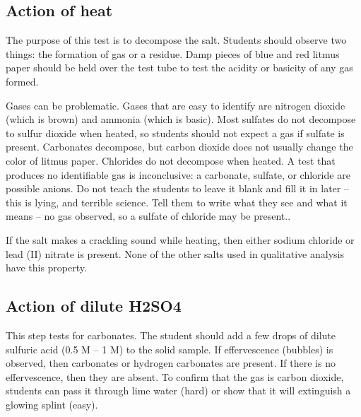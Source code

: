 \subsection{Action of heat}
The purpose of this test is to decompose the salt. 
Students should observe two things: the formation of gas or a residue. 
Damp pieces of blue and red litmus paper should be held 
over the test tube to test the acidity or basicity of any gas formed.

Gases can be problematic. 
Gases that are easy to identify are nitrogen dioxide 
(which is brown) and ammonia (which is basic). 
Most sulfates do not decompose to sulfur dioxide when heated, 
so students should not expect a gas if sulfate is present. 
Carbonates decompose, 
but carbon dioxide does not usually change the color of litmus paper. 
Chlorides do not decompose when heated. 
A test that produces no identifiable gas is inconclusive: a carbonate, 
sulfate, 
or chloride are possible anions. 
Do not teach the students to leave it blank and fill it in later – 
this is lying, 
and terrible science. 
Tell them to write what they see and what it means – no gas observed, 
so a sulfate of chloride may be present..

If the salt makes a crackling sound while heating, 
then either sodium chloride or lead (II) nitrate is present. 
None of the other salts used in qualitative analysis have this property.

\subsection{Action of dilute H2SO4}
This step tests for carbonates. 
The student should add a few drops of dilute sulfuric acid 
(0.5 M – 1 M) to the solid sample. 
If effervescence (bubbles) is observed, 
then carbonates or hydrogen carbonates are present. 
If there is no effervescence, 
then they are absent. 
To confirm that the gas is carbon dioxide, 
students can pass it through lime water 
(hard) or show that it will extinguish a glowing splint (easy).

